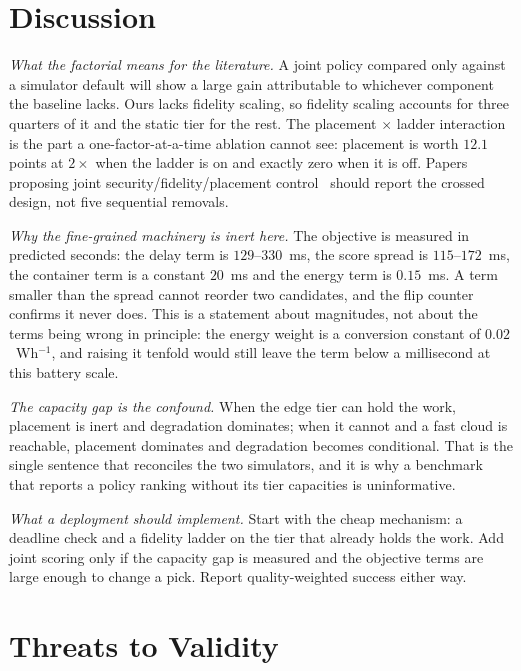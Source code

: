 \documentclass[journal,10pt]{IEEEtran}
\begin{document}
\section{Discussion}
\label{sec:disc}

\emph{What the factorial means for the literature.} A joint policy compared only
against a simulator default will show a large gain attributable to whichever
component the baseline lacks. Ours lacks fidelity scaling, so fidelity scaling
accounts for three quarters of it and the static tier for the rest. The
placement $\times$ ladder interaction is the part a one-factor-at-a-time
ablation cannot see: placement is worth $12.1$ points at $2\times$ when the
ladder is on and exactly zero when it is off. Papers proposing joint
security/fidelity/placement control~\cite{wang2026craft,he2026workflow} should
report the crossed design, not five sequential removals.

\emph{Why the fine-grained machinery is inert here.} The objective is measured
in predicted seconds: the delay term is $129$--$330$~ms, the score spread is
$115$--$172$~ms, the container term is a constant $20$~ms and the energy term is
$0.15$~ms. A term smaller than the spread cannot reorder two candidates, and the
flip counter confirms it never does. This is a statement about magnitudes, not
about the terms being wrong in principle: the energy weight is a conversion
constant of $0.02$~Wh$^{-1}$, and raising it tenfold would still leave the term
below a millisecond at this battery scale.

\emph{The capacity gap is the confound.} When the edge tier can hold the work,
placement is inert and degradation dominates; when it cannot and a fast cloud is
reachable, placement dominates and degradation becomes conditional. That is the
single sentence that reconciles the two simulators, and it is why a benchmark
that reports a policy ranking without its tier capacities is uninformative.

\emph{What a deployment should implement.} Start with the cheap mechanism: a
deadline check and a fidelity ladder on the tier that already holds the work.
Add joint scoring only if the capacity gap is measured and the objective terms
are large enough to change a pick. Report quality-weighted success either way.

\section{Threats to Validity}
\label{sec:threats}
\end{document}
